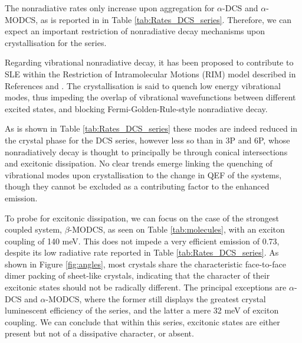 The nonradiative rates only increase upon aggregation for $\alpha$-DCS and $\alpha$-MODCS, as is reported in in Table \ref{tab:Rates_DCS_series}.\cite{Shi2017} Therefore, we can expect an important restriction of nonradiative decay mechanisms upon crystallisation for the series.

Regarding vibrational nonradiative decay, it has been proposed to contribute to SLE within the Restriction of Intramolecular Motions (RIM) model described in References  and . The crystallisation is said to quench low energy vibrational modes, thus impeding the overlap of vibrational wavefunctions between different excited states, and blocking Fermi-Golden-Rule-style nonradiative decay.

As is shown in Table \ref{tab:Rates_DCS_series} these modes are indeed reduced in the crystal phase for the DCS series, however less so than in 3P and 6P, whose nonradiatively decay is thought to principally be through conical intersections and excitonic dissipation. No clear trends emerge linking the quenching of vibrational modes upon crystallisation to the change in QEF of the systems, though they cannot be excluded as a contributing factor to the enhanced emission.

To probe for excitonic dissipation, we can focus on the case of the strongest coupled system, $\beta$-MODCS, as seen on Table \ref{tab:molecules}, with an exciton coupling of 140 meV. This does not impede a very efficient emission of 0.73, despite its low radiative rate reported in Table \ref{tab:Rates_DCS_series}. As shown in Figure \ref{fig:angles}, most crystals share the characteristic face-to-face dimer packing of sheet-like crystals, indicating that the character of their excitonic states should not be radically different. The principal exceptions are $\alpha$-DCS and $\alpha$-MODCS, where the former still displays the greatest crystal luminescent efficiency of the series, and the latter a mere 32 meV of exciton coupling. We can conclude that within this series, excitonic states are either present but not of a dissipative character, or absent.




